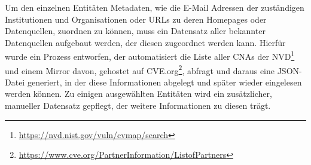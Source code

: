 Um den einzelnen Entitäten Metadaten, wie die E-Mail Adressen der zuständigen Institutionen und Organisationen oder URLs zu deren Homepages oder Datenquellen, zuordnen zu können, muss ein Datensatz aller bekannter Datenquellen aufgebaut werden, der diesen zugeordnet werden kann.
Hierfür wurde ein Prozess entworfen, der automatisiert die Liste aller CNAs der NVD\footnote{\url{https://nvd.nist.gov/vuln/cvmap/search}} und einem Mirror davon, gehostet auf CVE.org\footnote{\url{https://www.cve.org/PartnerInformation/ListofPartners}}, abfragt und daraus eine JSON-Datei generiert, in der diese Informationen abgelegt und später wieder eingelesen werden können.
Zu einigen ausgewählten Entitäten wird ein zusätzlicher, manueller Datensatz gepflegt, der weitere Informationen zu diesen trägt.
